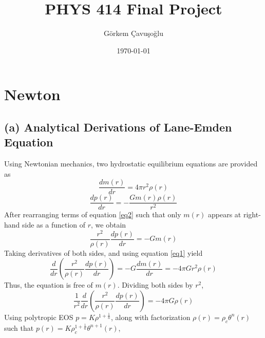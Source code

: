 \documentclass[aps,twocolumn,showpacs,preprintnumbers,nofootinbib,prl,superscriptaddress,groupedaddress]{revtex4-2}
\begin{document}
\title{PHYS 414 Final Project}
\author{G\"{o}rkem \c{C}avu\c{s}o\u{g}lu} %
\date{\today}

\begin{abstract}
\end{abstract}
\maketitle


\section{Newton}


\subsection{(a) Analytical Derivations of Lane-Emden Equation}
Using Newtonian mechanics, two hydrostatic equilibrium equations are provided as
\begin{equation}\label{eq1}
	\frac{d m(r)}{dr}= 4\pi r^2 \rho(r)
\end{equation}
\begin{equation}\label{eq2}
	\frac{dp(r)}{dr} = -\frac{Gm(r)\rho(r)}{r^2}
\end{equation}
After rearranging terms of equation \ref{eq2} such that only $m(r)$ appears at right-hand side as a function of $r$, we obtain
\begin{equation}
	\frac{r^2}{\rho(r)}\frac{dp(r)}{dr} = -Gm(r)
\end{equation}
Taking derivatives of both sides, and using equation \ref{eq1} yield
\begin{equation}
	\frac{d}{dr}(\frac{r^2}{\rho(r)}\frac{dp(r)}{dr}) = -G\frac{dm(r)}{dr}= -4\pi G r^2 \rho(r)
\end{equation}
Thus, the equation is free of $m(r)$. Dividing both sides by $r^2$,
\begin{equation}
	\frac{1}{r^2}\frac{d}{dr}(\frac{r^2}{\rho(r)}\frac{dp(r)}{dr}) = -4\pi G  \rho(r)
\end{equation}
Using polytropic EOS $p = K\rho^{1+\frac{1}{n}}$, along with factorization $\rho(r) = \rho_c\theta^n(r)$ such that $p(r) = 
K\rho_c^{1+\frac{1}{n}}\theta^{n+1}(r)$,
\end{document}

